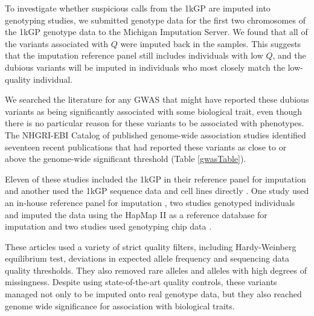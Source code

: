 \documentclass[9pt,lineno]{template}
\begin{document}
To investigate whether suspicious calls from the 1kGP are imputed into genotyping studies, we submitted genotype data for the first two chromosomes of the 1kGP genotype data to the Michigan Imputation Server.
We found that all of the variants associated with $Q$ were imputed back in the samples.
This suggests that the imputation reference panel still includes individuals with low $Q$, and the dubious variants will be imputed in individuals who most closely match the low-quality individual.

We searched the literature for any GWAS that might have reported these dubious variants as being significantly associated with some biological trait, even though there is no particular reason for these variants to be associated with phenotypes.
The NHGRI-EBI Catalog of published genome-wide association studies identified seventeen recent publications that had reported these variants as close to or above the genome-wide significant threshold (Table \ref{gwasTable}).

Eleven of these studies included the 1kGP in their reference panel for imputation \citep{xu2012genome, lutz2015genome, park2015mercapturic, astle2016allelic, herold2016family,  suhre2017connecting, lopez2017genome, tian2017genome,  spracklen2017association,  nagy2017exploration, gao2018genome} and another used the 1kGP sequence data and cell lines directly \citep{Mandage2017}.
One study used an in-house reference panel for imputation \citep{nishida2018key}, two studies genotyped individuals and imputed the data using the HapMap II as a reference  database for imputation \citep{Kraja2011, Ebejer2013} and two studies used genotyping chip data \citep{yucesoy2015genome, ellinghaus2016analysis}. 

These articles used a variety of strict quality filters, including Hardy-Weinberg equilibrium test, deviations in expected allele frequency and sequencing data quality thresholds.
They also removed rare alleles and alleles with high degrees of missingness.
Despite using state-of-the-art quality controls, these variants managed not only to be imputed onto real genotype data, but they also reached genome wide significance for association with biological traits.
\end{document}
